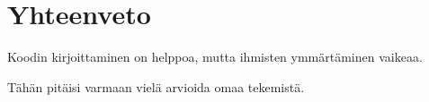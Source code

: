 \hypertarget{yhteenveto}{%
\chapter{Yhteenveto}\label{yhteenveto}}

Koodin kirjoittaminen on helppoa, mutta ihmisten ymmärtäminen vaikeaa.

Tähän pitäisi varmaan vielä arvioida omaa tekemistä.
